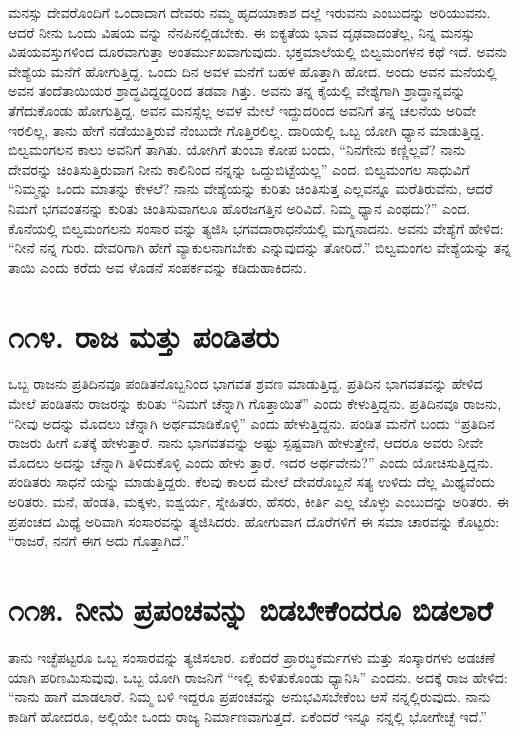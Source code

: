 ಮನಸ್ಸು ದೇವರೊಂದಿಗೆ ಒಂದಾದಾಗ ದೇವರು ನಮ್ಮ ಹೃದಯಾಕಾಶ ದಲ್ಲೆ ಇರುವನು ಎಂಬುದನ್ನು ಅರಿಯುವನು. ಆದರೆ ನೀನು ಒಂದು ವಿಷಯ ವನ್ನು ನೆನಪಿನಲ್ಲಿಡಬೇಕು. ಈ ಐಕ್ಯತೆಯ ಭಾವ ದೃಢವಾದಂತೆಲ್ಲ, ನಿನ್ನ ಮನಸ್ಸು ವಿಷಯವಸ್ತುಗಳಿಂದ ದೂರವಾಗುತ್ತಾ ಅಂತರ್ಮುಖವಾಗುವುದು. ಭಕ್ತಮಾಲೆಯಲ್ಲಿ ಬಿಲ್ವಮಂಗಳನ ಕಥೆ ಇದೆ. ಅವನು ವೇಶ್ಯೆಯ ಮನೆಗೆ ಹೋಗುತ್ತಿದ್ದ. ಒಂದು ದಿನ ಅವಳ ಮನೆಗೆ ಬಹಳ ಹೊತ್ತಾಗಿ ಹೋದ. ಅಂದು ಅವನ ಮನೆಯಲ್ಲಿ ಅವನ ತಂದೆತಾಯಿಯರ ಶ್ರಾದ್ಧವಿದ್ದದ್ದರಿಂದ ತಡವಾ ಗಿತ್ತು. ಅವನು ತನ್ನ ಕೈಯಲ್ಲಿ ವೇಶ್ಯೆಗಾಗಿ ಶ್ರಾದ್ಧಾನ್ನವನ್ನು ತೆಗೆದುಕೊಂಡು ಹೋಗುತ್ತಿದ್ದ. ಅವನ ಮನಸ್ಸೆಲ್ಲ ಅವಳ ಮೇಲೆ ಇದ್ದುದರಿಂದ ಅವನಿಗೆ ತನ್ನ ಚಲನೆಯ ಅರಿವೇ ಇರಲಿಲ್ಲ, ತಾನು ಹೇಗೆ ನಡೆಯುತ್ತಿರುವೆ ನೆಂಬುದೇ ಗೊತ್ತಿರಲಿಲ್ಲ. ದಾರಿಯಲ್ಲಿ ಒಬ್ಬ ಯೋಗಿ ಧ್ಯಾನ ಮಾಡುತ್ತಿದ್ದ. ಬಿಲ್ವಮಂಗಲನ ಕಾಲು ಅವನಿಗೆ ತಾಗಿತು. ಯೋಗಿಗೆ ತುಂಬಾ ಕೋಪ ಬಂದು, “ನಿನಗೇನು ಕಣ್ಣಿಲ್ಲವೆ? ನಾನು ದೇವರನ್ನು ಚಿಂತಿಸುತ್ತಿರುವಾಗ ನೀನು ಕಾಲಿನಿಂದ ನನ್ನನ್ನು ಒದ್ದುಬಿಟ್ಟೆಯಲ್ಲ” ಎಂದ. ಬಿಲ್ವಮಂಗಲ ಸಾಧುವಿಗೆ “ನಿಮ್ಮನ್ನು ಒಂದು ಮಾತನ್ನು ಕೇಳಲೆ? ನಾನು ವೇಶ್ಯೆಯನ್ನು ಕುರಿತು ಚಿಂತಿಸುತ್ತ ಎಲ್ಲವನ್ನೂ ಮರೆತಿರುವೆನು, ಆದರೆ ನಿಮಗೆ ಭಗವಂತನನ್ನು ಕುರಿತು ಚಿಂತಿಸುವಾಗಲೂ ಹೊರಜಗತ್ತಿನ ಅರಿವಿದೆ. ನಿಮ್ಮ ಧ್ಯಾನ ಎಂಥದು?” ಎಂದ. ಕೊನೆಯಲ್ಲಿ ಬಿಲ್ವಮಂಗಲನು ಸಂಸಾರ ವನ್ನು ತ್ಯಜಿಸಿ ಭಗವದಾರಾಧನೆಯಲ್ಲಿ ಮಗ್ನನಾದನು. ಅವನು ವೇಶ್ಯೆಗೆ ಹೇಳಿದ: “ನೀನೆ ನನ್ನ ಗುರು. ದೇವರಿಗಾಗಿ ಹೇಗೆ ವ್ಯಾಕುಲನಾಗಬೇಕು ಎನ್ನುವುದನ್ನು ತೋರಿದೆ.” ಬಿಲ್ವಮಂಗಲ ವೇಶ್ಯೆಯನ್ನು ತನ್ನ ತಾಯಿ ಎಂದು ಕರೆದು ಅವ ಳೊಡನೆ ಸಂಪರ್ಕವನ್ನು ಕಡಿದುಹಾಕಿದನು.


\section{\num{೧೧೪. } ರಾಜ ಮತ್ತು ಪಂಡಿತರು}

ಒಬ್ಬ ರಾಜನು ಪ್ರತಿದಿನವೂ ಪಂಡಿತನೊಬ್ಬನಿಂದ ಭಾಗವತ ಶ್ರವಣ ಮಾಡುತ್ತಿದ್ದ. ಪ್ರತಿದಿನ ಭಾಗವತವನ್ನು ಹೇಳಿದ ಮೇಲೆ ಪಂಡಿತನು ರಾಜರನ್ನು ಕುರಿತು “ನಿಮಗೆ ಚೆನ್ನಾಗಿ ಗೊತ್ತಾಯಿತೆ” ಎಂದು ಕೇಳುತ್ತಿದ್ದನು. ಪ್ರತಿದಿನವೂ ರಾಜನು, “ನೀವು ಅದನ್ನು ಮೊದಲು ಚೆನ್ನಾಗಿ ಅರ್ಥಮಾಡಿಕೊಳ್ಳಿ” ಎಂದು ಹೇಳುತ್ತಿದ್ದನು. ಪಂಡಿತ ಮನೆಗೆ ಬಂದು “ಪ್ರತಿದಿನ ರಾಜರು ಹೀಗೆ ಏತಕ್ಕೆ ಹೇಳುತ್ತಾರೆ. ನಾನು ಭಾಗವತವನ್ನು ಅಷ್ಟು ಸ್ಪಷ್ಟವಾಗಿ ಹೇಳುತ್ತೇನೆ, ಆದರೂ ಅವರು ನೀವೇ ಮೊದಲು ಅದನ್ನು ಚೆನ್ನಾಗಿ ತಿಳಿದುಕೊಳ್ಳಿ ಎಂದು ಹೇಳು ತ್ತಾರೆ. ಇದರ ಅರ್ಥವೇನು?” ಎಂದು ಯೋಚಿಸುತ್ತಿದ್ದನು. ಪಂಡಿತರು ಸಾಧನೆ ಯನ್ನು ಮಾಡುತ್ತಿದ್ದರು. ಕೆಲವು ಕಾಲದ ಮೇಲೆ ದೇವರೊಬ್ಬನೆ ಸತ್ಯ ಉಳಿದು ದೆಲ್ಲ ಮಿಥ್ಯವೆಂದು ಅರಿತರು. ಮನೆ, ಹೆಂಡತಿ, ಮಕ್ಕಳು, ಐಶ್ವರ್ಯ, ಸ್ನೇಹಿತರು, ಹೆಸರು, ಕೀರ್ತಿ ಎಲ್ಲ ಜೊಳ್ಳು ಎಂಬುದನ್ನು ಅರಿತರು. ಈ ಪ್ರಪಂಚದ ಮಿಥ್ಯೆ ಅರಿವಾಗಿ ಸಂಸಾರವನ್ನು ತ್ಯಜಿಸಿದರು. ಹೋಗುವಾಗ ದೊರೆಗಳಿಗೆ ಈ ಸಮಾ ಚಾರವನ್ನು ಕೊಟ್ಟರು: “ರಾಜರೆ, ನನಗೆ ಈಗ ಅದು ಗೊತ್ತಾಗಿದೆ.”


\section{\num{೧೧೫. } ನೀನು ಪ್ರಪಂಚವನ್ನು ಬಿಡಬೇಕೆಂದರೂ ಬಿಡಲಾರೆ}

ತಾನು ಇಚ್ಛೆಪಟ್ಟರೂ ಒಬ್ಬ ಸಂಸಾರವನ್ನು ತ್ಯಜಿಸಲಾರ. ಏಕೆಂದರೆ ಪ್ರಾರಬ್ಧಕರ್ಮಗಳು ಮತ್ತು ಸಂಸ್ಕಾರಗಳು ಅಡಚಣೆ ಯಾಗಿ ಪರಿಣಮಿಸುವುವು. ಒಬ್ಬ ಯೋಗಿ ರಾಜನಿಗೆ “ಇಲ್ಲಿ ಕುಳಿತುಕೊಂಡು ಧ್ಯಾನಿಸಿ” ಎಂದನು. ಅದಕ್ಕೆ ರಾಜ ಹೇಳಿದ: “ನಾನು ಹಾಗೆ ಮಾಡಲಾರೆ. ನಿಮ್ಮ ಬಳಿ ಇದ್ದರೂ ಪ್ರಪಂಚವನ್ನು ಅನುಭವಿಸಬೇಕೆಂಬ ಆಸೆ ನನ್ನಲ್ಲಿರುವುದು. ನಾನು ಕಾಡಿಗೆ ಹೋದರೂ, ಅಲ್ಲಿಯೇ ಒಂದು ರಾಜ್ಯ ನಿರ್ಮಾಣವಾಗುತ್ತದೆ. ಏಕೆಂದರೆ ಇನ್ನೂ ನನ್ನಲ್ಲಿ ಭೋಗೇಚ್ಛೆ ಇದೆ.”



